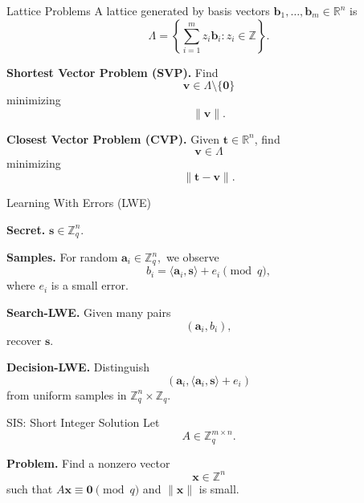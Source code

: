 \documentclass[serif, aspectratio=169]{beamer}
\begin{document}
	
\begin{frame}{Lattice Problems}
	A lattice generated by basis vectors $\bm{b}_1,\dots,\bm{b}_m \in \mathbb{R}^n$ is
	\[
	\Lambda = \left\{ \sum_{i=1}^m z_i \bm{b}_i : z_i \in \mathbb{Z} \right\}.
	\]
	
	\textbf{Shortest Vector Problem (SVP).}
	Find
	\[
	\bm{v} \in \Lambda \setminus \{\bm{0}\}
	\]
	minimizing
	\[
	\|\bm{v}\|.
	\]
	
	\textbf{Closest Vector Problem (CVP).}
	Given $\bm{t} \in \mathbb{R}^n$, find
	\[
	\bm{v} \in \Lambda
	\]
	minimizing
	\[
	\|\bm{t}-\bm{v}\|.
	\]
\end{frame}


	\begin{frame}{Learning With Errors (LWE)}
	
	\textbf{Secret.}
	$
	\bm{s} \in \mathbb{Z}_q^n.
	$
	
	\vspace{0.4em}
	\textbf{Samples.}
	For random
	$
	\bm{a}_i \in \mathbb{Z}_q^n,
	$
	we observe
	\[
	b_i = \langle \bm{a}_i,\bm{s} \rangle + e_i \pmod q,
	\]
	where $e_i$ is a small error.
	
	\vspace{0.4em}
	\textbf{Search-LWE.}
	Given many pairs
	\[
	(\bm{a}_i,b_i),
	\]
	recover $\bm{s}$.
	
	\textbf{Decision-LWE.}
	Distinguish
	\[
	(\bm{a}_i,\langle \bm{a}_i,\bm{s}\rangle + e_i)
	\]
	from uniform samples in
	$
	\mathbb{Z}_q^n \times \mathbb{Z}_q.
	$
	
\end{frame}


\begin{frame}{SIS: Short Integer Solution}
	Let
	\[
	A \in \mathbb{Z}_q^{m \times n}.
	\]
	
	\textbf{Problem.}
	Find a nonzero vector
	\[
	\bm{x} \in \mathbb{Z}^n
	\]
	such that
	$
	A\bm{x} \equiv \bm{0} \pmod q
	$
	and
	$
	\|\bm{x}\|
	$
	is small.
	
\end{frame}
\end{document}
